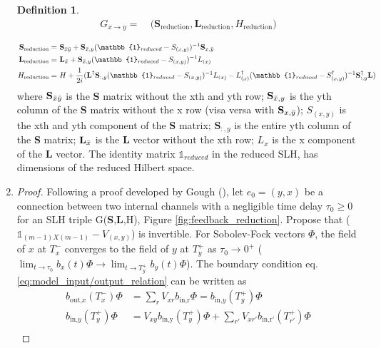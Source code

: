 \documentclass[a4paper]{article}
\theoremstyle{definition}
\newtheorem{definition}{Definition}[section]
\begin{document}
\begin{enumerate}[label=(\roman*)]
\begin{definition}
\begin{align*}
    G_{x \rightarrow y} = & \ \Bigg( \textbf{S}_{\text{reduction}}, \textbf{L}_{\text{reduction}}, H_{\text{reduction}} \Bigg) \\
\end{align*}
\begin{align}
\textbf{S}_{\text{reduction}} = & \ \textbf{S}_{\Bar{x}\Bar{y}} + \textbf{S}_{\Bar{x},y}(\mathbb{1}_{reduced}-S_{(x,y)})^{-1}\textbf{S}_{x,\Bar{y}} \\
\textbf{L}_{\text{reduction}} = & \ \textbf{L}_{\Bar{x}}+\textbf{S}_{\Bar{x},y}(\mathbb{1}_{reduced}-S_{(x,y)})^{-1}L_{(x)} \\
H_{\text{reduction}} = & \ H + \frac{1}{2i}(\textbf{L}^\dagger \textbf{S}_{:,y}(\mathbb{1}_{reduced}-S_{(x,y)})^{-1}L_{(x)} - L_{(x)}^\dagger (\mathbb{1}_{reduced}-S^\dagger_{(x,y)})^{-1}\textbf{S}^\dagger_{:,y}\textbf{L}) 
    \label{eq:feedback}
\end{align}
where $\textbf{S}_{\Bar{x}\Bar{y}} $ is the \textbf{S} matrix without the xth and yth row; $\textbf{S}_{\Bar{x},y}$ is the yth column of the \textbf{S} matrix without the x row (visa versa with $\textbf{S}_{x,\Bar{y}}$); $S_{(x,y)}$ is the xth and yth component of the \textbf{S} matrix; $\textbf{S}_{:,y}$ is the entire yth column of the \textbf{S} matrix; $\textbf{L}_{\Bar{x}}$ is the \textbf{L} vector without the xth row; $L_x$ is the x component of the \textbf{L} vector. The identity matrix $\mathbb{1}_{reduced}$ in the reduced SLH, has dimensions of the reduced Hilbert space.
\end{definition}
\item 
\begin{proof}
Following a proof developed by Gough (\cite{Gough_2008}), let $e_0 = (y,x)$ be a connection between two internal channels with a negligible time delay $\tau_0 \ge 0$ for an SLH triple G(\textbf{S},\textbf{L},H), Figure \ref{fig:feedback_reduction}. Propose that ($\mathbb{1}_{(m-1)X(m-1)} - V_{(x,y)}$) is invertible. For Sobolev-Fock vectors $\Phi$, the field of $x$ at $T^-_{x}$ converges to the field of $y$ at $T^+_{y}$ as $\tau_0 \rightarrow 0^+$ ($\lim_{t\to \tau_0} b_{x}(t) \Phi \rightarrow \lim_{t\to T^+_{y}} b_{y}(t)\Phi$). The boundary condition eq. \ref{eq:model_input/output_relation} can be written as 
\begin{align}
    b_{\text{out,$x$}}(T^-_{x})\Phi & = \sum_{r}V_{xr}b_{\text{in,r}}\Phi  = b_{\text{in,$y$}}(T^+_{y})\Phi \nonumber \\
    b_{\text{in,$y$}}(T^+_{y})\Phi & = V_{xy}b_{\text{in,y}}(T^+_{y})\Phi + \sum_{r'}V_{xr'}b_{\text{in,r'}}(T^+_{r'})\Phi \nonumber \\

\end{align}
\end{proof}
\end{enumerate}
\end{document}
